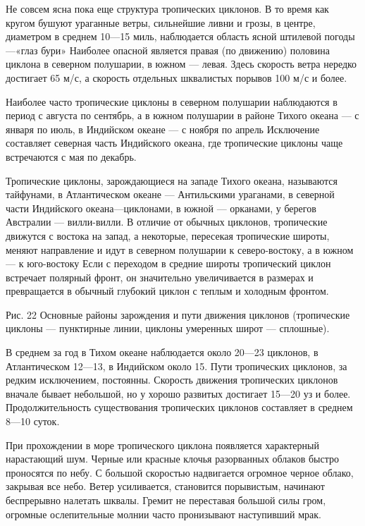 Не совсем ясна пока еще структура тропических циклонов. В то время как кругом бушуют ураганные ветры, сильнейшие ливни и грозы, в центре, диаметром в среднем 10—15 миль, наблюдается область ясной штилевой погоды—«глаз бури» Наиболее опасной является правая (по движению) половина циклона в северном полушарии, в южном — левая. Здесь скорость ветра нередко достигает 65 м/с, а скорость отдельных шквалистых порывов 100 м/с и более.

Наиболее часто тропические циклоны в северном полушарии наблюдаются в период с августа по сентябрь, а в южном полушарии в районе Тихого океана — с января по июль, в Индийском океане — с ноября по апрель Исключение составляет северная часть Индийского океана, где тропические циклоны чаще встречаются с мая по декабрь.

Тропические циклоны, зарождающиеся на западе Тихого океана, называются тайфунами, в Атлантическом океане — Антильскими ураганами, в северной части Индийского океана—циклонами, в южной — орканами, у берегов Австралии — вилли-вилли. В отличие от обычных циклонов, тропические движутся с востока на запад, а некоторые, пересекая тропические широты, меняют направление и идут в северном полушарии к северо-востоку, а в южном — к юго-востоку Если с переходом в средние широты тропический циклон встречает полярный фронт, он значительно увеличивается в размерах и превращается в обычный глубокий циклон с теплым и холодным фронтом.


Рис. 22 Основные районы зарождения и пути движения циклонов
(тропические циклоны --- пунктирные линии, циклоны умеренных широт --- сплошные).

В среднем за год в Тихом океане наблюдается около 20—23 циклонов, в Атлантическом 12—13, в Индийском около 15. Пути тропических циклонов, за редким исключением, постоянны. Скорость движения тропических циклонов вначале бывает небольшой, но у хорошо развитых достигает 15—20 уз и более. Продолжительность существования тропических циклонов составляет в среднем 8—10 суток.

При прохождении в море тропического циклона появляется характерный нарастающий шум. Черные или красные клочья разорванных облаков быстро проносятся по небу. С большой скоростью надвигается огромное черное облако, закрывая все небо. Ветер усиливается, становится порывистым, начинают беспрерывно налетать шквалы. Гремит не переставая большой силы гром, огромные ослепительные молнии часто пронизывают наступивший мрак.

